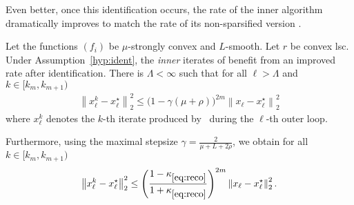 Even better, once this identification occurs, the rate of the inner algorithm \salgo dramatically improves to match the rate of its non-sparsified version \dave.

\begin{theorem}\label{th:imprate}
Let the functions $(f_i)$ be $\mu$-strongly convex and $L$-smooth. Let $r$ be convex lsc. Under Assumption~\ref{hyp:ident}, the \emph{inner} iterates of \recoalgo benefit from an improved rate after identification. There is $\Lambda<\infty$ such that for all $\ell>\Lambda$ and  $k\in [k_m, k_{m+1})$
\begin{align*}
    \left\| x_\ell^k - x_\ell^\star \right\|^2_2 \le \Big(1 - \gamma (\mu+\rho)  \Big)^{2m} \left\|x_{\ell}-x_\ell^\star\right\|^2_2
\end{align*}
where $x^k_\ell$ denotes the $k$-th iterate produced by \spyI~during the $\ell$-th outer loop.

Furthermore, using the maximal stepsize $\gamma = \frac{2}{\mu + L + 2\rho}$, we obtain for all $k\in [k_m, k_{m+1})$
\begin{align*}
    \left\| x_\ell^k - x_\ell^\star \right\|^2_2 \le \left( \frac{1-\kappa_{\eqref{eq:reco}}}{1+\kappa_{\eqref{eq:reco}}}  \right)^{2m} \left\|x_{\ell}-x_\ell^\star\right\|^2_2.
\end{align*}
\end{theorem}

